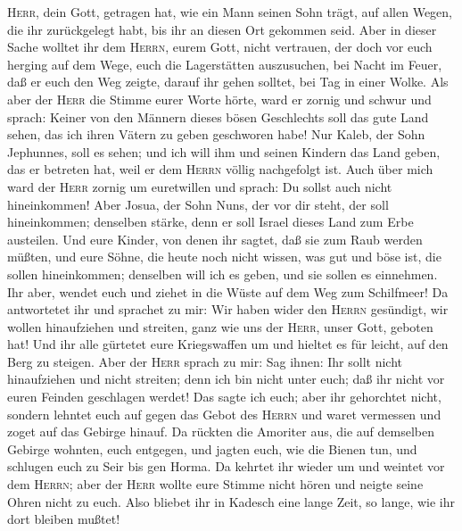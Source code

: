 \textsc{Herr}, dein Gott, getragen hat, wie ein Mann seinen Sohn trägt,
auf allen Wegen, die ihr zurückgelegt habt, bis ihr an diesen Ort
gekommen seid.  Aber in dieser Sache wolltet ihr dem
\textsc{Herrn}, eurem Gott, nicht vertrauen,  der doch
vor euch herging auf dem Wege, euch die Lagerstätten auszusuchen, bei
Nacht im Feuer, daß er euch den Weg zeigte, darauf ihr gehen solltet,
bei Tag in einer Wolke.  Als aber der \textsc{Herr} die
Stimme eurer Worte hörte, ward er zornig und schwur und sprach:
 Keiner von den Männern dieses bösen Geschlechts soll das
gute Land sehen, das ich ihren Vätern zu geben geschworen habe!
 Nur Kaleb, der Sohn Jephunnes, soll es sehen; und ich
will ihm und seinen Kindern das Land geben, das er betreten hat, weil er
dem \textsc{Herrn} völlig nachgefolgt ist.  Auch über
mich ward der \textsc{Herr} zornig um euretwillen und sprach: Du sollst
auch nicht hineinkommen!  Aber Josua, der Sohn Nuns, der
vor dir steht, der soll hineinkommen; denselben stärke, denn er soll
Israel dieses Land zum Erbe austeilen.  Und eure Kinder,
von denen ihr sagtet, daß sie zum Raub werden müßten, und eure Söhne,
die heute noch nicht wissen, was gut und böse ist, die sollen
hineinkommen; denselben will ich es geben, und sie sollen es einnehmen.
 Ihr aber, wendet euch und ziehet in die Wüste auf dem
Weg zum Schilfmeer!  Da antwortetet ihr und sprachet zu
mir: Wir haben wider den \textsc{Herrn} gesündigt, wir wollen
hinaufziehen und streiten, ganz wie uns der \textsc{Herr}, unser Gott,
geboten hat! Und ihr alle gürtetet eure Kriegswaffen um und hieltet es
für leicht, auf den Berg zu steigen.  Aber der
\textsc{Herr} sprach zu mir: Sag ihnen: Ihr sollt nicht hinaufziehen und
nicht streiten; denn ich bin nicht unter euch; daß ihr nicht vor euren
Feinden geschlagen werdet!  Das sagte ich euch; aber ihr
gehorchtet nicht, sondern lehntet euch auf gegen das Gebot des
\textsc{Herrn} und waret vermessen und zoget auf das Gebirge hinauf.
 Da rückten die Amoriter aus, die auf demselben Gebirge
wohnten, euch entgegen, und jagten euch, wie die Bienen tun, und
schlugen euch zu Seir bis gen Horma.  Da kehrtet ihr
wieder um und weintet vor dem \textsc{Herrn}; aber der \textsc{Herr}
wollte eure Stimme nicht hören und neigte seine Ohren nicht zu euch.
 Also bliebet ihr in Kadesch eine lange Zeit, so lange,
wie ihr dort bleiben mußtet!

